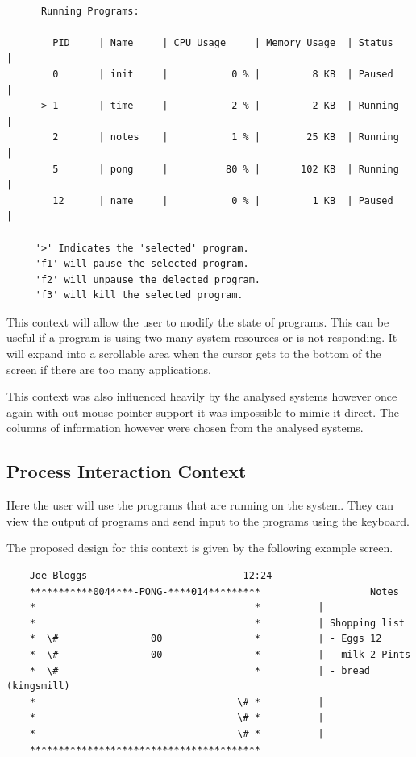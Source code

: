 \documentclass[a4paper]{report}
\begin{document}
{\ttfamily \small
  \begin{framed}
    \begin{verbatim}

      Running Programs:

        PID     | Name     | CPU Usage     | Memory Usage  | Status     |
        0       | init     |           0 % |         8 KB  | Paused     |
      > 1       | time     |           2 % |         2 KB  | Running    |
        2       | notes    |           1 % |        25 KB  | Running    |
        5       | pong     |          80 % |       102 KB  | Running    |
        12      | name     |           0 % |         1 KB  | Paused     |

     '>' Indicates the 'selected' program.
     'f1' will pause the selected program.
     'f2' will unpause the delected program.
     'f3' will kill the selected program.

    \end{verbatim}
  \end{framed}
}

This context will allow the user to modify the state of programs. This can be useful if a program is using two many system resources or is not responding. It will expand into a scrollable area when the cursor gets to the bottom of the screen if there are too many applications.

This context was also influenced heavily by the analysed systems however once again with out mouse pointer support it was impossible to mimic it direct. The columns of information however were chosen from the analysed systems.

\subsection{Process Interaction Context}

Here the user will use the programs that are running on the system. They can view the output of programs and send input to the programs using the keyboard.

The proposed design for this context is given by the following example screen.

{\ttfamily \small
  \begin{framed}
    \begin{verbatim}
    Joe Bloggs                           12:24
    ***********004****-PONG-****014*********                   Notes
    *                                      *          |
    *                                      *          | Shopping list
    *  \#                00                *          | - Eggs 12
    *  \#                00                *          | - milk 2 Pints
    *  \#                                  *          | - bread (kingsmill)
    *                                   \# *          |
    *                                   \# *          |
    *                                   \# *          |
    ****************************************
    \end{verbatim}
  \end{framed}
}
\end{document}
